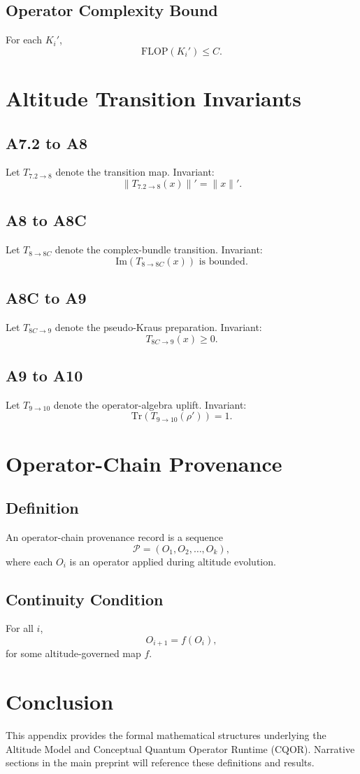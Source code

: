 \documentclass[11pt]{article}
\begin{document}
\subsection{Operator Complexity Bound}
For each $K_i'$,
\[
\mathrm{FLOP}(K_i') \le C.
\]

\section{Altitude Transition Invariants}

\subsection{A7.2 to A8}
Let $T_{7.2 \rightarrow 8}$ denote the transition map.  
Invariant:
\[
\|T_{7.2 \rightarrow 8}(x)\|' = \|x\|' .
\]

\subsection{A8 to A8C}
Let $T_{8 \rightarrow 8C}$ denote the complex-bundle transition.  
Invariant:
\[
\mathrm{Im}(T_{8 \rightarrow 8C}(x)) \text{ is bounded}.
\]

\subsection{A8C to A9}
Let $T_{8C \rightarrow 9}$ denote the pseudo-Kraus preparation.  
Invariant:
\[
T_{8C \rightarrow 9}(x) \ge 0.
\]

\subsection{A9 to A10}
Let $T_{9 \rightarrow 10}$ denote the operator-algebra uplift.  
Invariant:
\[
\mathrm{Tr}(T_{9 \rightarrow 10}(\rho')) = 1.
\]

\section{Operator-Chain Provenance}

\subsection{Definition}
An operator-chain provenance record is a sequence
\[
\mathcal{P} = (O_1, O_2, \dots, O_k),
\]
where each $O_i$ is an operator applied during altitude evolution.

\subsection{Continuity Condition}
For all $i$,
\[
O_{i+1} = f(O_i),
\]
for some altitude-governed map $f$.

\section{Conclusion}
This appendix provides the formal mathematical structures underlying the
Altitude Model and Conceptual Quantum Operator Runtime (CQOR). Narrative
sections in the main preprint will reference these definitions and results.
\end{document}
